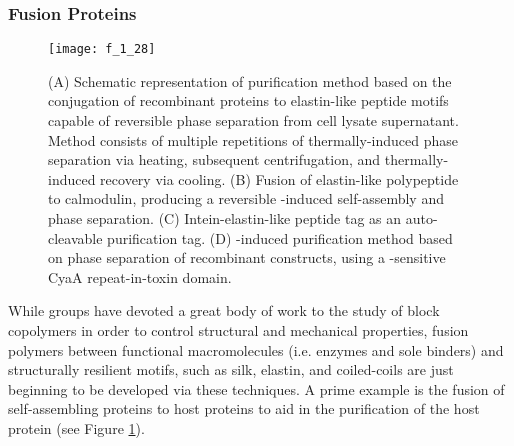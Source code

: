 \begin{refsection}
\subsubsection{Fusion Proteins}
\begin{figure}[h!] \centering \texttt{[image: f\_1\_28]}
    \caption[(A) Schematic representation of purification method based on the
        conjugation of recombinant proteins to elastin-like peptide motifs
        capable of reversible phase separation from cell lysate supernatant.
        Method consists of multiple repetitions of thermally-induced phase
        separation via heating, subsequent centrifugation, and thermally-induced
        recovery via cooling. (B) Fusion of elastin-like polypeptide to
        calmodulin, producing a reversible -induced self-assembly and
        phase separation. (C) Intein-elastin-like peptide tag as an
        auto-cleavable purification tag. (D) -induced purification
        method based on phase separation of recombinant constructs, using a
    -sensitive CyaA repeat-in-toxin domain.]{(A) Schematic
            representation of purification method based on the conjugation of
            recombinant proteins to elastin-like peptide motifs capable of
            reversible phase separation from cell lysate supernatant. Method
            consists of multiple repetitions of thermally-induced phase
            separation via heating, subsequent centrifugation, and
            thermally-induced recovery via cooling.\cite{Meyer2001} (B) Fusion
            of elastin-like polypeptide to calmodulin, producing a reversible
            -induced self-assembly and phase separation.\cite{Kim2008a}
            (C) Intein-elastin-like peptide tag as an auto-cleavable
            purification tag.\cite{Banki2005} (D) -induced purification
            method based on phase separation of recombinant constructs, using a
            -sensitive CyaA repeat-in-toxin domain.\cite{Shur2013}}
            \label{fig:fusion_examples}
\end{figure}
While groups have devoted a great body of work to the study of block copolymers
in order to control structural and mechanical properties,\cite{Rabotyagova2009}
fusion polymers between functional macromolecules (i.e. enzymes and sole
binders) and structurally resilient motifs, such as silk, elastin, and
coiled-coils are just beginning to be developed via these
techniques.\cite{Kim2008a,Meyer1999,Wheeldon2009} A prime example is the fusion
of self-assembling proteins to host proteins to aid in the purification of the
host protein (see Figure \ref{fig:fusion_examples}).


\end{refsection}
